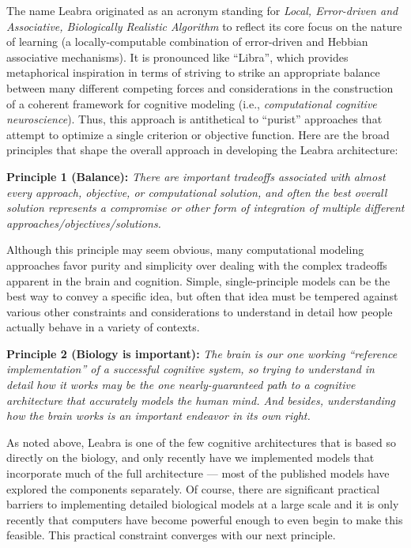 \documentclass[11pt,twoside]{article}
\begin{document}
The name Leabra originated as an acronym standing for {\em Local, Error-driven
  and Associative, Biologically Realistic Algorithm} to reflect its core focus
on the nature of learning (a locally-computable combination of error-driven
and Hebbian associative mechanisms). It is pronounced like ``Libra'', which
provides metaphorical inspiration in terms of striving to strike an
appropriate balance between many different competing forces and considerations
in the construction of a coherent framework for cognitive modeling (i.e., {\em
  computational cognitive neuroscience}).  Thus, this approach is antithetical
to ``purist'' approaches that attempt to optimize a single criterion or
objective function.  Here are the broad principles that shape the overall
approach in developing the Leabra architecture:

{\bf Principle 1 (Balance):} {\em There are important tradeoffs associated
  with almost every approach, objective, or computational solution, and often
  the best overall solution represents a compromise or other form of
  integration of multiple different approaches/objectives/solutions.}

Although this principle may seem obvious, many computational modeling
approaches favor purity and simplicity over dealing with the complex tradeoffs
apparent in the brain and cognition.  Simple, single-principle models can be
the best way to convey a specific idea, but often that idea must be tempered
against various other constraints and considerations to understand in detail
how people actually behave in a variety of contexts.

{\bf Principle 2 (Biology is important):} {\em The brain is our one working
  ``reference implementation'' of a successful cognitive system, so trying to
  understand in detail how it works may be the one nearly-guaranteed path to a
  cognitive architecture that accurately models the human mind.  And besides, understanding how the brain
  works is an important endeavor in its own right. }

As noted above, Leabra is one of the few cognitive architectures that is based
so directly on the biology, and only recently have we implemented models that
incorporate much of the full architecture --- most of the published models
have explored the components separately.  Of course, there are significant
practical barriers to implementing detailed biological models at a large scale
and it is only recently that computers have become powerful enough to even
begin to make this feasible.  This practical constraint converges with our
next principle.
\end{document}
